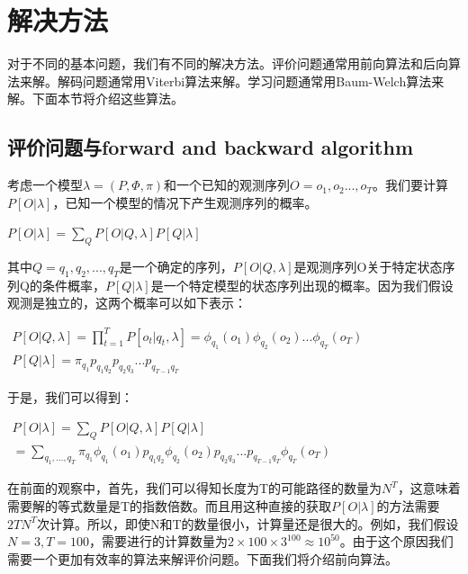 \documentclass[UTF8]{ctexart}
\begin{document}
\section{解决方法}

对于不同的基本问题，我们有不同的解决方法。评价问题通常用前向算法和后向算法来解。解码问题通常用Viterbi算法来解。学习问题通常用Baum-Welch算法来解。下面本节将介绍这些算法。

\subsection{评价问题与forward and backward algorithm}

考虑一个模型$\lambda=(P,\Phi,\pi)$和一个已知的观测序列$O=o_1,o_2...,o_T$。我们要计算$P[O|\lambda]$，已知一个模型的情况下产生观测序列的概率。

\begin{center}
$P[O|\lambda]=\sum_QP[O|Q,\lambda]P[Q|\lambda]$
\end{center}

其中$Q=q_1,q_2,...,q_T$是一个确定的序列，$P[O|Q,\lambda]$是观测序列O关于特定状态序列Q的条件概率，$P[Q|\lambda]$是一个特定模型的状态序列出现的概率。因为我们假设观测是独立的，这两个概率可以如下表示：

\begin{center}
$
\begin{aligned}
P[O|Q,\lambda]=\prod _{t=1}^TP[o_t|q_t,\lambda]=\phi_{q_1}(o_1)\phi_{q_2}(o_2)...\phi_{q_T}(o_T) \\
P[Q|\lambda]=\pi_{q_1}p_{q_1q_2}p_{q_2q_3}...p_{q_{T-1}q_T}\end{aligned}$
\end{center}

于是，我们可以得到：

\begin{center}
$
\begin{aligned}
P[O|\lambda]=\sum_QP[O|Q,\lambda]P[Q|\lambda]\\
=\sum_{q_1,...,q_T}\pi_{q_1}\phi_{q_1}(o_1)p_{q_1q_2}\phi_{q_2}(o_2)p_{q_2q_3}...p_{q_{T-1}q_T}\phi_{q_T}(o_T)\end{aligned}$
\end{center}

在前面的观察中，首先，我们可以得知长度为T的可能路径的数量为$N^T$，这意味着需要解的等式数量是T的指数倍数。而且用这种直接的获取$P[O|\lambda]$的方法需要$2TN^T$次计算。所以，即使N和T的数量很小，计算量还是很大的。例如，我们假设$N=3,T=100$，需要进行的计算数量为$2\times 100\times 3^100 \approx 10^50$。由于这个原因我们需要一个更加有效率的算法来解评价问题。下面我们将介绍前向算法。
\end{document}
